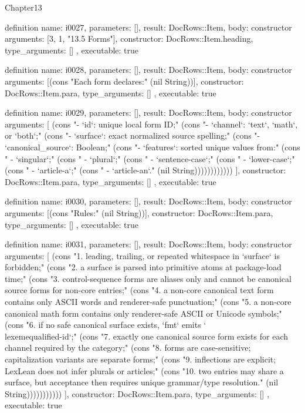 \begin{lexlean}{Chapter13}
\begin{semanticmodule}
definition{
  name: i0027,
  parameters: [],
  result: DocRows::Item,
  body: constructor{
    arguments: [3, 1, "13.5 Forms"],
    constructor: DocRows::Item.heading,
    type_arguments: []
  },
  executable: true
}

definition{
  name: i0028,
  parameters: [],
  result: DocRows::Item,
  body: constructor{
    arguments: [(cons "Each form declares:" (nil String))],
    constructor: DocRows::Item.para,
    type_arguments: []
  },
  executable: true
}

definition{
  name: i0029,
  parameters: [],
  result: DocRows::Item,
  body: constructor{
    arguments: [
      (cons "- `id`: unique local form ID;" (cons "- `channel`: `text`, `math`, or `both`;" (cons "- `surface`: exact normalized source spelling;" (cons "- `canonical_source`: Boolean;" (cons "- `features`: sorted unique values from:" (cons "  - `singular`;" (cons "  - `plural`;" (cons "  - `sentence-case`;" (cons "  - `lower-case`;" (cons "  - `article-a`;" (cons "  - `article-an`." (nil String))))))))))))
    ],
    constructor: DocRows::Item.para,
    type_arguments: []
  },
  executable: true
}

definition{
  name: i0030,
  parameters: [],
  result: DocRows::Item,
  body: constructor{
    arguments: [(cons "Rules:" (nil String))],
    constructor: DocRows::Item.para,
    type_arguments: []
  },
  executable: true
}

definition{
  name: i0031,
  parameters: [],
  result: DocRows::Item,
  body: constructor{
    arguments: [
      (cons "1. leading, trailing, or repeated whitespace in `surface` is forbidden;" (cons "2. a surface is parsed into primitive atoms at package-load time;" (cons "3. control-sequence forms are aliases only and cannot be canonical source forms for non-core entries;" (cons "4. a non-core canonical text form contains only ASCII words and renderer-safe punctuation;" (cons "5. a non-core canonical math form contains only renderer-safe ASCII or Unicode symbols;" (cons "6. if no safe canonical surface exists, `fmt` emits `\\lexeme{qualified-id}`;" (cons "7. exactly one canonical source form exists for each channel required by the category;" (cons "8. forms are case-sensitive; capitalization variants are separate forms;" (cons "9. inflections are explicit; LexLean does not infer plurals or articles;" (cons "10. two entries may share a surface, but acceptance then requires unique grammar/type resolution." (nil String)))))))))))
    ],
    constructor: DocRows::Item.para,
    type_arguments: []
  },
  executable: true
}


\end{semanticmodule}
\end{lexlean}
